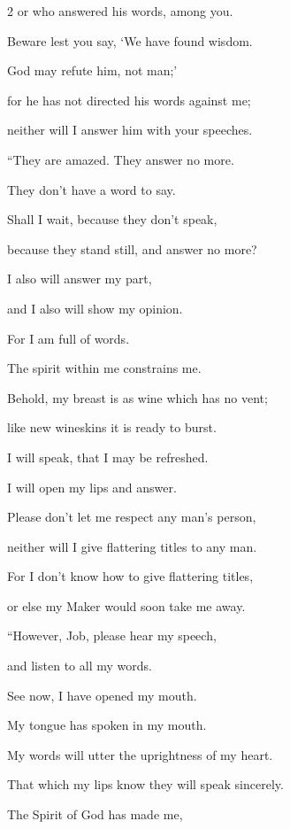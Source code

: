 \begin{multicols}{2}
	or who answered his words, among you.
	
	\myverse{}Beware lest you say, ‘We have found wisdom.
	
	God may refute him, not man;’
	
	\myverse{}for he has not directed his words against me;
	
	neither will I answer him with your speeches.
	
		\vspace{\baselineskip}
	
	
	\myverse{}“They are amazed. They answer no more.
	
	They don’t have a word to say.
	
	\myverse{}Shall I wait, because they don’t speak,
	
	because they stand still, and answer no more?
	
	\myverse{}I also will answer my part,
	
	and I also will show my opinion.
	
	\myverse{}For I am full of words.
	
	The spirit within me constrains me.
	
	\myverse{}Behold, my breast is as wine which has no vent;
	
	like new wineskins it is ready to burst.
	
	\myverse{}I will speak, that I may be refreshed.
	
	I will open my lips and answer.
	
	\myverse{}Please don’t let me respect any man’s person,
	
	neither will I give flattering titles to any man.
	
	\myverse{}For I don’t know how to give flattering titles,
	
	or else my Maker would soon take me away.
	
	
	
	
	\mychapter{} \myverse*{}“However, Job, please hear my speech,
	
	\quad\quad and listen to all my words.
	
	\myverse{}See now, I have opened my mouth.
	
	My tongue has spoken in my mouth.
	
	\myverse{}My words will utter the uprightness of my heart.
	
	That which my lips know they will speak sincerely.
	
	\myverse{}The Spirit of God has made me,
	

\end{multicols}
